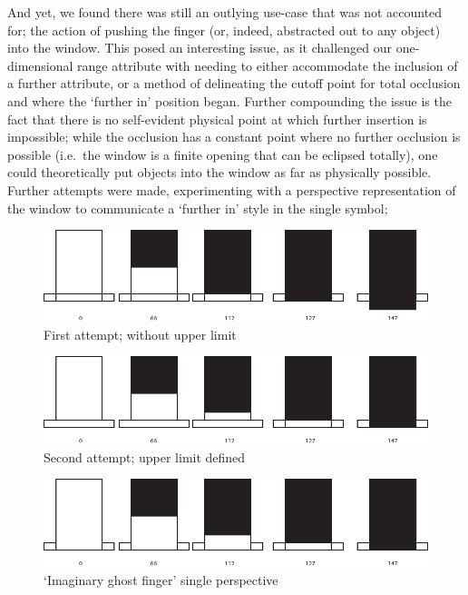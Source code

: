 And yet, we found there was still an outlying use-case that was not accounted for; the action of pushing the finger (or, indeed, abstracted out to any object) into the window. 
This posed an interesting issue, as it challenged our one-dimensional range attribute with needing to either accommodate the inclusion of a further attribute, or a method of delineating the cutoff point for total occlusion and where the `further in' position began. 
Further compounding the issue is the fact that there is no self-evident physical point at which further insertion is impossible; 
while the occlusion has a constant point where no further occlusion is possible (i.e.\ the window is a finite opening that can be eclipsed totally), one could theoretically put objects into the window as far as physically possible.
Further attempts were made, experimenting with a perspective representation of the window to communicate a `further in' style in the single symbol; 

\begin{figure}
    \includegraphics[width=\linewidth]{./resources/Asset 4.pdf}
    \caption{First attempt; without upper limit}\label{fig:Asset4}
\end{figure}

\begin{figure}
    \includegraphics[width=\linewidth]{./resources/Asset 5.pdf}
    \caption{Second attempt; upper limit defined}\label{fig:Asset5}
\end{figure}

\begin{figure}
    \includegraphics[width=\linewidth]{./resources/Asset 6.pdf}
    \caption{`Imaginary ghost finger' single perspective}\label{fig:Asset6}
\end{figure}

